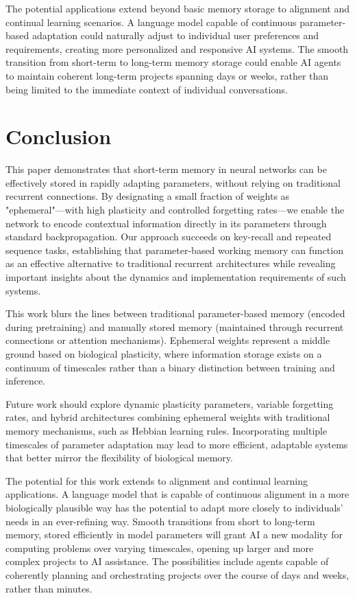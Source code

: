 \documentclass[conference]{IEEEtran}
\begin{document}
The potential applications extend beyond basic memory storage to alignment and continual learning scenarios. A language model capable of continuous parameter-based adaptation could naturally adjust to individual user preferences and requirements, creating more personalized and responsive AI systems. The smooth transition from short-term to long-term memory storage could enable AI agents to maintain coherent long-term projects spanning days or weeks, rather than being limited to the immediate context of individual conversations.

\section{Conclusion}

This paper demonstrates that short-term memory in neural networks can be effectively stored in rapidly adapting parameters, without relying on traditional recurrent connections. By designating a small fraction of weights as "ephemeral"—with high plasticity and controlled forgetting rates—we enable the network to encode contextual information directly in its parameters through standard backpropagation. Our approach succeeds on key-recall and repeated sequence tasks, establishing that parameter-based working memory can function as an effective alternative to traditional recurrent architectures while revealing important insights about the dynamics and implementation requirements of such systems.

This work blurs the lines between traditional parameter-based memory (encoded during pretraining) and manually stored memory (maintained through recurrent connections or attention mechanisms). Ephemeral weights represent a middle ground based on biological plasticity, where information storage exists on a continuum of timescales rather than a binary distinction between training and inference.

Future work should explore dynamic plasticity parameters, variable forgetting rates, and hybrid architectures combining ephemeral weights with traditional memory mechanisms, such as Hebbian learning rules. Incorporating multiple timescales of parameter adaptation may lead to more efficient, adaptable systems that better mirror the flexibility of biological memory.

The potential for this work extends to alignment and continual learning applications. A language model that is capable of continuous alignment in a more biologically plausible way has the potential to adapt more closely to individuals' needs in an ever-refining way. Smooth transitions from short to long-term memory, stored efficiently in model parameters will grant AI a new modality for computing problems over varying timescales, opening up larger and more complex projects to AI assistance. The possibilities include agents capable of coherently planning and orchestrating projects over the course of days and weeks, rather than minutes.



\vspace{12pt}
\end{document}
